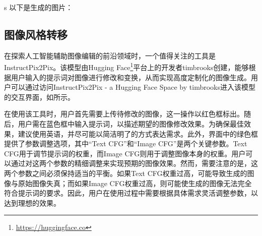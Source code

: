 
\begin{gptbox}
s \footnotesize{以下是生成的图片：}
\fig[H]{
    \texttt{[image: gc]}
}
\end{gptbox}


\subsection{图像风格转移}

在探索人工智能辅助图像编辑的前沿领域时，一个值得关注的工具是InstructPix2Pix。该模型由Hugging Face\footnote{\url{https://huggingface.co}}平台上的开发者timbrooks创建，能够根据用户输入的提示词对图像进行修改和变换，从而实现高度定制化的图像生成。用户可以通过访问InstructPix2Pix - a Hugging Face Space by timbrooks进入该模型的交互界面，如所示。

在使用该工具时，用户首先需要上传待修改的图像，这一操作以红色框标出。随后，用户需在蓝色框中输入提示词，以描述期望的图像修改效果。为确保最佳效果，建议使用英语，并尽可能以简洁明了的方式表达需求。此外，界面中的绿色框提供了参数调整选项，其中“Text CFG”和“Image CFG”是两个关键参数。Text CFG用于调节提示词的权重，而Image CFG则用于调整图像本身的权重。用户可以通过对这两个参数的精细调整来实现预期的图像效果。然而，需要注意的是，这两个参数之间必须保持适当的平衡。如果Text CFG权重过高，可能导致生成的图像与原始图像失真；而如果Image CFG权重过高，则可能使生成的图像无法完全符合提示词的要求。因此，用户在使用过程中需要根据具体需求灵活调整参数，以达到理想的效果。


